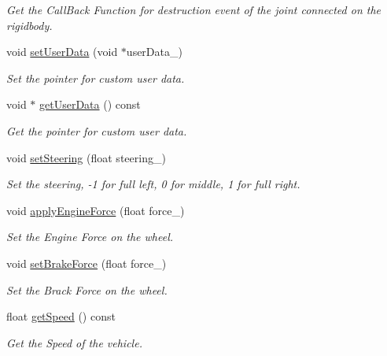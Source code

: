 \begin{DoxyCompactItemize}
\begin{DoxyCompactList}\small\item\em Get the Call\+Back Function for destruction event of the joint connected on the rigidbody. \end{DoxyCompactList}\item 
void \hyperlink{class_magnum_1_1_physics3_1_1_vehicle_a86ff63467957b662190213c82c4217ee}{set\+User\+Data} (void $\ast$user\+Data\+\_\+)
\begin{DoxyCompactList}\small\item\em Set the pointer for custom user data. \end{DoxyCompactList}\item 
void $\ast$ \hyperlink{class_magnum_1_1_physics3_1_1_vehicle_acd92bd78fac6d9b066a8fb17a2124c24}{get\+User\+Data} () const 
\begin{DoxyCompactList}\small\item\em Get the pointer for custom user data. \end{DoxyCompactList}\item 
void \hyperlink{class_magnum_1_1_physics3_1_1_vehicle_a7623fd69f76c9d0fb83b1a984ccd0f63}{set\+Steering} (float steering\+\_\+)
\begin{DoxyCompactList}\small\item\em Set the steering, -\/1 for full left, 0 for middle, 1 for full right. \end{DoxyCompactList}\item 
void \hyperlink{class_magnum_1_1_physics3_1_1_vehicle_ae28f1d1d5970aa0a53be82c222335788}{apply\+Engine\+Force} (float force\+\_\+)
\begin{DoxyCompactList}\small\item\em Set the Engine Force on the wheel. \end{DoxyCompactList}\item 
void \hyperlink{class_magnum_1_1_physics3_1_1_vehicle_a8a5e7196505062a1e183a4b96b77f4ae}{set\+Brake\+Force} (float force\+\_\+)
\begin{DoxyCompactList}\small\item\em Set the Brack Force on the wheel. \end{DoxyCompactList}\item 
float \hyperlink{class_magnum_1_1_physics3_1_1_vehicle_a4e7ba8b6104bf8481ba8cbfd839ffaaa}{get\+Speed} () const 
\begin{DoxyCompactList}\small\item\em Get the Speed of the vehicle. \end{DoxyCompactList}\item 

\end{DoxyCompactItemize}
